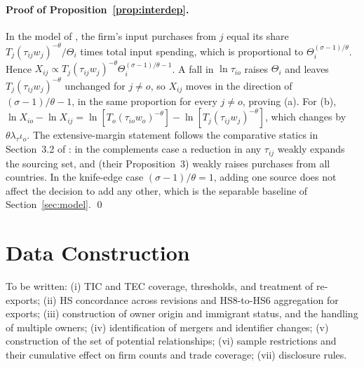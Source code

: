 \documentclass[12pt]{article}
\theoremstyle{remark}
\newcommand{\planned}[1]{\textcolor{OliveGreen}{#1}}
\begin{document}
\paragraph{Proof of Proposition~\ref{prop:interdep}.} In the model of
\citet{antras2017}, the firm's input purchases from $j$ equal its share
$T_j(\tau_{ij}w_j)^{-\theta}/\Theta_i$ times total input spending, which is
proportional to $\Theta_i^{(\sigma-1)/\theta}$. Hence $X_{ij}\propto
T_j(\tau_{ij}w_j)^{-\theta}\Theta_i^{(\sigma-1)/\theta-1}$. A fall in
$\ln\tau_{io}$ raises $\Theta_i$ and leaves $T_j(\tau_{ij}w_j)^{-\theta}$
unchanged for $j\neq o$, so $X_{ij}$ moves in the direction of
$(\sigma-1)/\theta-1$, in the same proportion for every $j\neq o$, proving (a).
For (b), $\ln X_{io}-\ln X_{ij}=\ln[T_o(\tau_{io}w_o)^{-\theta}]-
\ln[T_j(\tau_{ij}w_j)^{-\theta}]$, which changes by $\theta\lambda_\tau\iota_o$.
The extensive-margin statement follows the comparative statics in Section~3.2 of \citet{antras2017}: in the complements case a reduction in any $\tau_{ij}$ weakly expands the sourcing set, and (their Proposition~3) weakly raises purchases from all countries. In the knife-edge case $(\sigma-1)/\theta=1$, adding one source does not affect the decision to add any other, which is the separable baseline of Section~\ref{sec:model}. \qed

\section{Data Construction}
\label{app:data}

\planned{To be written: (i) TIC and TEC coverage, thresholds, and treatment of
re-exports; (ii) HS concordance across revisions and HS8-to-HS6 aggregation for
exports; (iii) construction of owner origin and immigrant status, and the
handling of multiple owners; (iv) identification of mergers and identifier
changes; (v) construction of the set of potential relationships; (vi) sample
restrictions and their cumulative effect on firm counts and trade coverage;
(vii) disclosure rules.}
\end{document}
